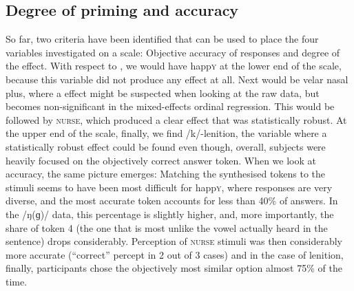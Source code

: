 		\subsection{Degree of priming and accuracy}
\largerpage
So far, two criteria have been identified that can be used to place the four variables investigated on a scale: Objective accuracy of responses and degree of the  effect.
With respect to , we would have happ\textsc{y} at the lower end of the scale, because this variable did not produce any  effect at all.
Next would be velar nasal plus, where a  effect might be suspected when looking at the raw data, but becomes non-significant in the mixed-effects ordinal regression.
This would be followed by \textsc{nurse}, which produced a clear  effect that was statistically robust.
At the upper end of the scale, finally, we find /k/-lenition, the variable where a statistically robust  effect could be found even though, overall, subjects were heavily focused on the objectively correct answer token.
When we look at accuracy, the same picture emerges:
Matching the synthesised tokens to the stimuli seems to have been most difficult for happ\textsc{y}, where responses are very diverse, and the most accurate token accounts for less than 40\% of answers.
In the /ŋ(ɡ)/ data, this percentage is slightly higher, and, more importantly, the share of token 4 (the one that is most unlike the vowel actually heard in the sentence) drops considerably.
Perception of \textsc{nurse} stimuli was then considerably more accurate (``correct'' percept in 2 out of 3 cases) and in the case of lenition, finally, participants chose the objectively most similar option almost 75\% of the time.

